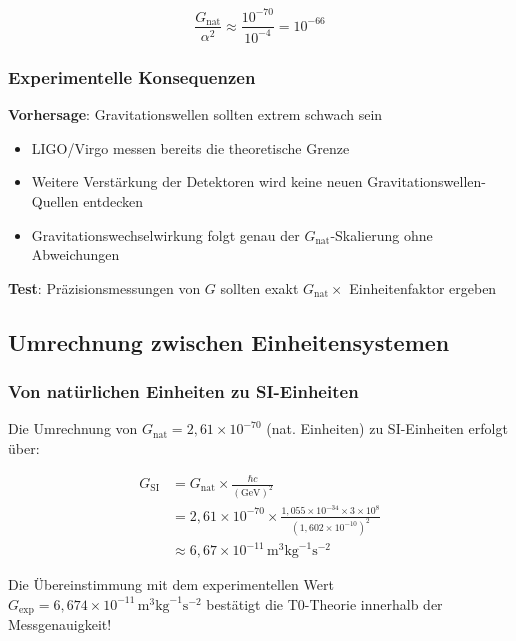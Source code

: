 \documentclass[12pt,a4paper]{article}
\theoremstyle{definition}
\begin{document}
\begin{equation}
	\frac{G_{\text{nat}}}{\alpha^2} \approx \frac{10^{-70}}{10^{-4}} = 10^{-66}
\end{equation}

\subsubsection{Experimentelle Konsequenzen}

\begin{experiment}
	\textbf{Vorhersage}: Gravitationswellen sollten extrem schwach sein
	\begin{itemize}
		\item LIGO/Virgo messen bereits die theoretische Grenze
		\item Weitere Verstärkung der Detektoren wird keine neuen Gravitationswellen-Quellen entdecken
		\item Gravitationswechselwirkung folgt genau der $G_{\text{nat}}$-Skalierung ohne Abweichungen
	\end{itemize}
	\textbf{Test}: Präzisionsmessungen von $G$ sollten exakt $G_{\text{nat}} \times$ Einheitenfaktor ergeben
\end{experiment}

\subsection{Umrechnung zwischen Einheitensystemen}

\subsubsection{Von natürlichen Einheiten zu SI-Einheiten}

Die Umrechnung von $G_{\text{nat}} = 2{,}61 \times 10^{-70}$ (nat. Einheiten) zu SI-Einheiten erfolgt über:

\begin{align}
	G_{\text{SI}} &= G_{\text{nat}} \times \frac{\hbar c}{(\text{GeV})^2} \\
	&= 2{,}61 \times 10^{-70} \times \frac{1{,}055 \times 10^{-34} \times 3 \times 10^8}{(1{,}602 \times 10^{-10})^2} \\
	&\approx 6{,}67 \times 10^{-11} \, \text{m}^3 \text{kg}^{-1} \text{s}^{-2}
\end{align}

\begin{important}
	Die Übereinstimmung mit dem experimentellen Wert $G_{\text{exp}} = 6{,}674 \times 10^{-11} \, \text{m}^3 \text{kg}^{-1} \text{s}^{-2}$ bestätigt die T0-Theorie innerhalb der Messgenauigkeit!
\end{important}
\end{document}
